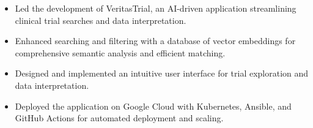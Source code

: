 


\begin{itemize}[nosep]
  \item Led the development of VeritasTrial, an AI-driven application streamlining clinical trial searches and data interpretation.
  \item Enhanced searching and filtering with a database of vector embeddings for comprehensive semantic analysis and efficient matching.
  \item Designed and implemented an intuitive user interface for trial exploration and data interpretation.
  \item Deployed the application on Google Cloud with Kubernetes, Ansible, and GitHub Actions for automated deployment and scaling.
\end{itemize}
